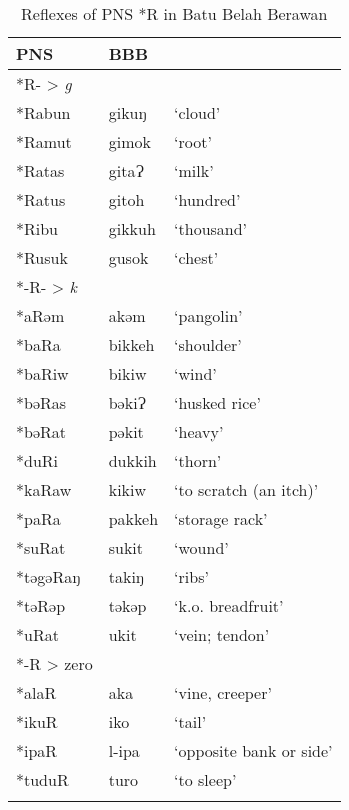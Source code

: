 \documentclass[output=paper]{langscibook}
\begin{document}
\begin{table}
\caption{\label{tab:Reflexes-BBB-PNS-R}Reflexes of PNS *R in Batu Belah Berawan}
\begin{tabular}{lll}
\lsptoprule
      PNS &      BBB\\
\midrule
*R- > \textit{g}    \\
\midrule
*Rabun    &gikuŋ   &   \enquote*{cloud}                   \\
*Ramut    &gimok   &   \enquote*{root}                   \\
*Ratas    &  gitaɁ &   \enquote*{milk}                 \\
*Ratus    &  gitoh &   \enquote*{hundred}                 \\
*Ribu     & gikkuh &   \enquote*{thousand}                 \\
*Rusuk    &gusok   &   \enquote*{chest}                   \\
\midrule
*-R- > \textit{k}  &        &                              \\
\midrule
*aRəm     & akəm   &   \enquote*{pangolin}     \\
*baRa     & bikkeh &   \enquote*{shoulder}   \\
*baRiw    &bikiw   &   \enquote*{wind}     \\
*bəRas    &  bəkiɁ &   \enquote*{husked rice}   \\
*bəRat    &  pəkit &   \enquote*{heavy}   \\
*duRi     & dukkih &   \enquote*{thorn}   \\
*kaRaw    &kikiw   &   \enquote*{to scratch (an itch)}     \\
*paRa     & pakkeh &   \enquote*{storage rack}   \\
*suRat    &  sukit &   \enquote*{wound}   \\
*təgəRaŋ  &  takiŋ &   \enquote*{ribs}   \\
*təRəp    &  təkəp &   \enquote*{k.o. breadfruit}   \\
*uRat     & ukit   &   \enquote*{vein; tendon}     \\
\midrule
*-R > zero& &                              \\
\midrule
*alaR     & aka    &  \enquote*{vine, creeper}    \\
*ikuR     & iko    &  \enquote*{tail}    \\
*ipaR     & l-ipa  &  \enquote*{opposite bank or side}  \\
*tuduR    &  turo  &  \enquote*{to sleep}  \\
\lspbottomrule
\end{tabular}
\end{table}
\end{document}
